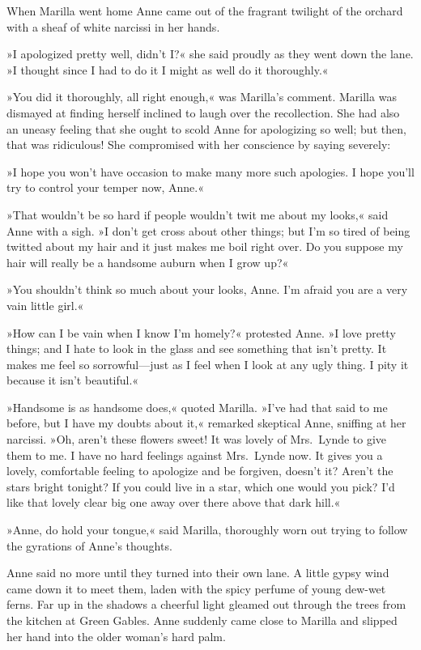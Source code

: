 When Marilla went home Anne came out of the fragrant twilight of the orchard with a sheaf of white narcissi in her hands.

»I apologized pretty well, didn't I?« she said proudly as they went down the lane. »I thought since I had to do it I might as well do it thoroughly.«

»You did it thoroughly, all right enough,« was Marilla's comment. Marilla was dismayed at finding herself inclined to laugh over the recollection. She had also an uneasy feeling that she ought to scold Anne for apologizing so well; but then, that was ridiculous! She compromised with her conscience by saying severely:

»I hope you won't have occasion to make many more such apologies. I hope you'll try to control your temper now, Anne.«

»That wouldn't be so hard if people wouldn't twit me about my looks,« said Anne with a sigh. »I don't get cross about other things; but I'm so tired of being twitted about my hair and it just makes me boil right over. Do you suppose my hair will really be a handsome auburn when I grow up?«

»You shouldn't think so much about your looks, Anne. I'm afraid you are a very vain little girl.«

»How can I be vain when I know I'm homely?« protested Anne. »I love pretty things; and I hate to look in the glass and see something that isn't pretty. It makes me feel so sorrowful—just as I feel when I look at any ugly thing. I pity it because it isn't beautiful.«

»Handsome is as handsome does,« quoted Marilla. »I've had that said to me before, but I have my doubts about it,« remarked skeptical Anne, sniffing at her narcissi. »Oh, aren't these flowers sweet! It was lovely of Mrs.~Lynde to give them to me. I have no hard feelings against Mrs.~Lynde now. It gives you a lovely, comfortable feeling to apologize and be forgiven, doesn't it? Aren't the stars bright tonight? If you could live in a star, which one would you pick? I'd like that lovely clear big one away over there above that dark hill.«

»Anne, do hold your tongue,« said Marilla, thoroughly worn out trying to follow the gyrations of Anne's thoughts.

Anne said no more until they turned into their own lane. A little gypsy wind came down it to meet them, laden with the spicy perfume of young dew-wet ferns. Far up in the shadows a cheerful light gleamed out through the trees from the kitchen at Green Gables. Anne suddenly came close to Marilla and slipped her hand into the older woman's hard palm.

